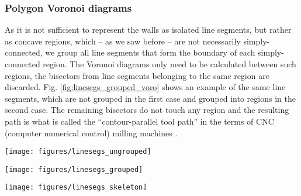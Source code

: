 \subsubsection*{Polygon Voronoi diagrams}

As it is not sufficient to represent the walls as isolated line segments, but rather as concave regions, which -- as we saw before --
are not necessarily simply-connected, we group all line segments that form the boundary of each simply-connected region.
The Voronoi diagrams only need to be calculated between such regions, the bisectors from line segments belonging to the
same region are discarded. Fig. \ref{fig:linesegs_grouped_voro} shows an example of the same line segments, which are not
grouped in the first case and grouped into regions in the second case. The remaining bisectors do not touch any region and
the resulting path is what is called the ``contour-parallel tool path'' in the terms of CNC (computer numerical control) 
milling machines \cite{Jeong1998, wiki_milling}.


\label{sec:voronoi}
\begin{figure*}
	\begin{minipage}{0.5 \textwidth}
		\begin{center}
			\texttt{[image: figures/linesegs\_ungrouped]}
		\end{center}
	\end{minipage}
	\begin{minipage}{0.5 \textwidth}
		\begin{center}
			\texttt{[image: figures/linesegs\_grouped]}
		\end{center}
	\end{minipage}
	\begin{minipage}{0.5 \textwidth}
		\begin{center}
			\texttt{[image: figures/linesegs\_skeleton]}
		\end{center}
	\end{minipage}
	\caption{Panel (a): Ungrouped line segments and their Voronoi bisectors.
		Panel (b): The same line segments, but with each polygonal region grouped.
		The Voronoi diagram is only calculated between groups, not within the same group.
		Panel (c): A mixture of the first two cases, where not entire regions are grouped
		as in case (b), but where each convex sub-region forms its own group.
		\label{fig:linesegs_grouped_voro}}
\end{figure*}



